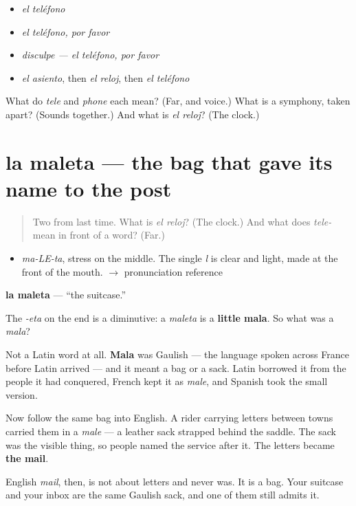 \begin{itemize}
\raggedright
  \item \emph{el teléfono}
  \item \emph{el teléfono, por favor}
  \item \emph{disculpe — el teléfono, por favor}
  \item \emph{el asiento}, then \emph{el reloj}, then \emph{el teléfono}
\end{itemize}

\begin{tcolorbox}[breakable,colback=teal!4,colframe=teal!35!black,title={Before you move on}]
What do \emph{tele} and \emph{phone} each mean? (Far, and voice.) What is a symphony, taken apart? (Sounds together.) And what is \emph{el reloj}? (The clock.)
\end{tcolorbox}
\section[la maleta]{la maleta — the bag that gave its name to the post}

\label{lesson:ES-C312-maleta}



\begin{quote}
Two from last time. What is \emph{el reloj}? (The clock.) And what does \emph{tele-} mean in front of a word? (Far.)
\end{quote}

\begin{sounds}
\begin{itemize}
\raggedright
  \item \emph{ma-LE-ta}, stress on the middle. The single \emph{l} is clear and light, made at the front of the mouth. $\to$ pronunciation reference
\end{itemize}
\end{sounds}

\begin{cousinweb}
\textbf{la maleta} — \textquotedblleft{}the suitcase.\textquotedblright{}

The \emph{-eta} on the end is a diminutive: a \emph{maleta} is a \textbf{little mala}. So what was a \emph{mala}?

Not a Latin word at all. \textbf{Mala} was Gaulish — the language spoken across France before Latin arrived — and it meant a bag or a sack. Latin borrowed it from the people it had conquered, French kept it as \emph{male}, and Spanish took the small version.

Now follow the same bag into English. A rider carrying letters between towns carried them in a \emph{male} — a leather sack strapped behind the saddle. The sack was the visible thing, so people named the service after it. The letters became \textbf{the mail}.

English \emph{mail}, then, is not about letters and never was. It is a bag. Your suitcase and your inbox are the same Gaulish sack, and one of them still admits it.
\end{cousinweb}

